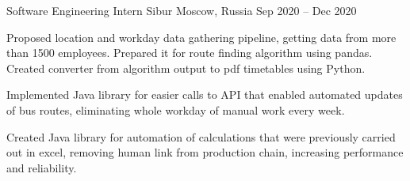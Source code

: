 \begin{cventries}
  \cventry
  {Software Engineering Intern} %
  {Sibur} %
  {Moscow, Russia} %
  {Sep 2020 -- Dec 2020} %
  {
    \begin{cvitems} %
      \item Proposed location and workday data gathering pipeline, getting data from more than 1500 employees. Prepared it for route finding algorithm using pandas. Created converter from algorithm output to pdf timetables using Python.
      \item Implemented Java library for easier calls to API that enabled automated updates of bus routes, eliminating whole workday of manual work every week.
      \item Created Java library for automation of calculations that were previously carried out in excel, removing human link from production chain, increasing performance and reliability.
    \end{cvitems}
  }

\end{cventries}
